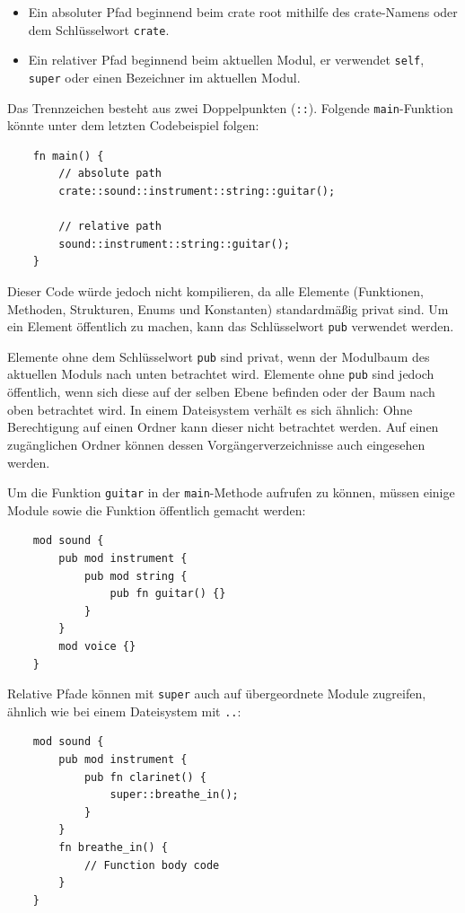 \begin{itemize}
    \item Ein absoluter Pfad beginnend beim crate root mithilfe des crate-Namens oder dem Schlüsselwort \verb"crate".
    \item Ein relativer Pfad beginnend beim aktuellen Modul, er verwendet \verb"self", \verb"super" oder einen Bezeichner im aktuellen Modul.
\end{itemize}

Das Trennzeichen besteht aus zwei Doppelpunkten (\verb"::"). Folgende \verb"main"-Funktion könnte unter dem letzten Codebeispiel folgen:

\begin{lstlisting}
    fn main() {
        // absolute path
        crate::sound::instrument::string::guitar();

        // relative path
        sound::instrument::string::guitar();
    }
\end{lstlisting}

Dieser Code würde jedoch nicht kompilieren, da alle Elemente (Funktionen, Methoden, Strukturen, Enums und Konstanten) standardmäßig privat sind. Um ein Element öffentlich zu machen, kann das Schlüsselwort \verb"pub" verwendet werden.

Elemente ohne dem Schlüsselwort \verb"pub" sind privat, wenn der Modulbaum des aktuellen Moduls \glqq nach unten\grqq{} betrachtet wird. Elemente ohne \verb"pub" sind jedoch öffentlich, wenn sich diese auf der selben Ebene befinden oder der Baum \glqq nach oben\grqq{} betrachtet wird. In einem Dateisystem verhält es sich ähnlich: Ohne Berechtigung auf einen Ordner kann dieser nicht betrachtet werden. Auf einen zugänglichen Ordner können dessen Vorgängerverzeichnisse auch eingesehen werden.

Um die Funktion \verb"guitar" in der \verb"main"-Methode aufrufen zu können, müssen ei\-ni\-ge Module sowie die Funktion öffentlich gemacht werden:

\begin{lstlisting}
    mod sound {
        pub mod instrument {
            pub mod string {
                pub fn guitar() {}
            }
        }
        mod voice {}
    }
\end{lstlisting}

Relative Pfade können mit \verb"super" auch auf übergeordnete Module zugreifen, ähnlich wie bei einem Dateisystem mit \glqq\verb".."\grqq{}:

\begin{lstlisting}
    mod sound {
        pub mod instrument {
            pub fn clarinet() {
                super::breathe_in();
            }
        }
        fn breathe_in() {
            // Function body code
        }
    }
\end{lstlisting}

